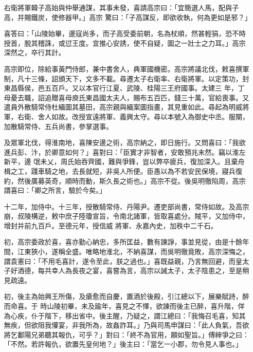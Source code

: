 \begin{pinyinscope}
 右衛將軍韓子高始與仲舉通謀，其事未發，喜請高宗曰：「宜簡選人馬，配與子高，并賜鐵炭，使修器甲。」高宗
 驚曰：「子高謀反，即欲收執，何為更如是邪？」



 喜答曰：「山陵始畢，邊寇尚多，而子高受委前朝，名為杖順，然甚輕狷，恐不時授首，脫其稽誅，或愆王度。宜推心安誘，使不自疑，圖之一壯士之力耳。」高宗深然之，卒行其計。



 高宗即位，除給事黃門侍郎，兼中書舍人，典軍國機密。高宗將議北伐，敕喜撰軍制，凡十三條，詔頒天下，文多不載。尋遷太子右衛率、右衛將軍。以定策功，封東昌縣侯，邑五百戶。又以本官行江夏、武陵、桂陽三王府國事。太建三
 年，丁母憂去職，詔追贈喜母庾氏東昌國太夫人，賜布五百匹，錢三十萬，官給喪事。又遣員外散騎常侍杜緬圖其墓田，高宗親與緬案圖指畫，其見重如此。尋起為明威將軍，右衛、舍人如故。改授宣遠將軍、義興太守。尋以本號入為御史中丞。服闋，加散騎常侍、五兵尚書，參掌選事。



 及眾軍北伐，得淮南地，喜陳安邊之術，高宗納之，即日施行。又問喜曰：「我欲進兵彭、汴，於卿意如何？」喜對曰：「臣實才非智者，安敢預兆未然。竊以淮左新平，邊
 氓未乂，周氏始吞齊國，難與爭鋒，豈以弊卒疲兵，復加深入。且棄舟楫之工，踐車騎之地，去長就短，非吳人所便。臣愚以為不若安民保境，寢兵復約，然後廣募英奇，順時而動，斯久長之術也。」高宗不從。後吳明徹陷周，高宗謂喜曰：「卿之所言，驗於今矣。」



 十二年，加侍中。十三年，授散騎常侍、丹陽尹。遷吏部尚書，常侍如故。及高宗崩，叔陵構逆，敕中庶子陸瓊宣旨，令南北諸軍，皆取喜處分。賊平，又加侍中，增封并前九百戶。至德元年，授信威
 將軍、永嘉內史，加秩中二千石。



 初，高宗委政於喜，喜亦勤心納忠，多所匡益，數有諫諍，事並見從，由是十餘年間，江東狹小，遂稱全盛。唯略地淮北，不納喜謀，而吳明徹竟敗，高宗深悔之，謂袁憲曰：「不用毛喜計，遂令至此，朕之過也。」喜既益親，乃言無回避，而皇太子好酒德，每共幸人為長夜之宴，喜嘗為言，高宗以誡太子，太子陰患之，至是稍見疏遠。



 初，後主為始興王所傷，及瘡愈而自慶，置酒於後殿，引江總以下，展樂賦詩，醉而命喜。于
 時山陵初畢，未及踰年，喜見之不懌，欲諫而後主已醉，喜升階，佯為心疾，仆于階下，移出省中。後主醒，乃疑之，謂江總曰：「我悔召毛喜，知其無疾，但欲阻我懽宴，非我所為，故姦詐耳。」乃與司馬申謀曰：「此人負氣，吾欲將乞鄱陽兄弟聽其報仇，可乎？」對曰：「終不為官用，願如聖旨。」傅縡爭之曰：「不然。若許報仇，欲置先皇何地？」後主曰：「當乞一小郡，勿令見人事也。」




\end{pinyinscope}
